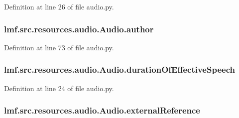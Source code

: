 Definition at line 26 of file audio.\+py.

\hypertarget{classlmf_1_1src_1_1resources_1_1audio_1_1_audio_a3f62581c092b3011a2c6a70928ae8c0a}{
\subsubsection[{author}]{\setlength{\rightskip}{0pt plus 5cm}lmf.\+src.\+resources.\+audio.\+Audio.\+author}}\label{classlmf_1_1src_1_1resources_1_1audio_1_1_audio_a3f62581c092b3011a2c6a70928ae8c0a}


Definition at line 73 of file audio.\+py.

\hypertarget{classlmf_1_1src_1_1resources_1_1audio_1_1_audio_ad1640839eb1c58ca5ef9796eb7c0f559}{
\subsubsection[{duration\+Of\+Effective\+Speech}]{\setlength{\rightskip}{0pt plus 5cm}lmf.\+src.\+resources.\+audio.\+Audio.\+duration\+Of\+Effective\+Speech}}\label{classlmf_1_1src_1_1resources_1_1audio_1_1_audio_ad1640839eb1c58ca5ef9796eb7c0f559}


Definition at line 24 of file audio.\+py.

\hypertarget{classlmf_1_1src_1_1resources_1_1audio_1_1_audio_acedec7cf6764d262298924f7deb0841a}{
\subsubsection[{external\+Reference}]{\setlength{\rightskip}{0pt plus 5cm}lmf.\+src.\+resources.\+audio.\+Audio.\+external\+Reference}}\label{classlmf_1_1src_1_1resources_1_1audio_1_1_audio_acedec7cf6764d262298924f7deb0841a}


